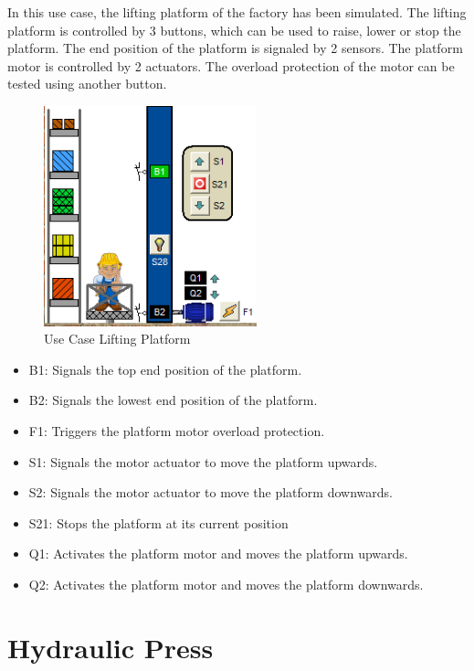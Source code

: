In this use case, the lifting platform of the factory has been simulated. The lifting platform is controlled by 3 buttons, which can be used to raise, lower or stop the platform. The end position of the platform is signaled by 2 sensors. The platform motor is controlled by 2 actuators. The overload protection of the motor can be tested using another button.

\begin{figure}[h]
    \centering
    \includegraphics[width=0.55\textwidth]{images/usecase_lifting_platform.png}
    \caption{Use Case Lifting Platform}
    \label{fig:UseCaseLiftingPlatform}
\end{figure}

\begin{itemize}
    \item B1: Signals the top end position of the platform.
    \item B2: Signals the lowest end position of the platform.
    \item F1: Triggers the platform motor overload protection.
    \item S1: Signals the motor actuator to move the platform upwards.
    \item S2: Signals the motor actuator to move the platform downwards.
    \item S21: Stops the platform at its current position
    \item Q1: Activates the platform motor and moves the platform upwards.
    \item Q2: Activates the platform motor and moves the platform downwards.
\end{itemize}

\section{Hydraulic Press}

